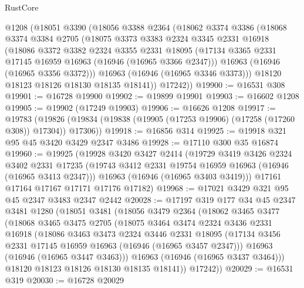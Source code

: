 \begin{lexlean}{RustCore}
\begin{coremodule}
    @1208
    (@18051
      @3390
      (@18056
        @3388
        @2364
        (@18062
          @3374
          @3386
          (@18068
            @3374
            @3384
            @2705
            (@18075
              @3373
              @3383
              @2324
              @3345
              @2331
              @16918
              (@18086
                @3372
                @3382
                @2324
                @3355
                @2331
                @18095
                (@17134 @3365 @2331 @17145 @16959 @16963 (@16946 (@16965 @3366 @2347)))
                @16963
                (@16946 (@16965 @3356 @3372)))
              @16963
              (@16946 (@16965 @3346 @3373)))
            @18120
            @18123
            @18126
            @18130
            @18135
            @18141))
        @17242))
@19900 := @16531 @308
@19901 := @16728 @19900
@19902 := @19899 @19901
@19903 := @16602 @1208
@19905 := @19902 (@17249 @19903)
@19906 := @16626 @1208
@19917 := @19783
    (@19826 (@19834 (@19838 (@19905 (@17253 @19906) (@17258 (@17260 @308)) @17304)) @17306))
@19918 := @16856 @314
@19925 := @19918 @321 @95 @45 @3420 @3429 @2347 @3486
@19928 := @17110 @300 @35 @16874
@19960 := @19925
    (@19928
      @3420
      @3427
      @2414
      (@19729
        @3419
        @3426
        @2324
        @3402
        @2331
        @17235
        (@19743 @3412 @2331 @19754 @16959 @16963 (@16946 (@16965 @3413 @2347)))
        @16963
        (@16946 (@16965 @3403 @3419)))
      @17161
      @17164
      @17167
      @17171
      @17176
      @17182)
@19968 := @17021 @3429 @321 @95 @45 @2347 @3483 @2347 @2442
@20028 := @17197
    @319
    @177
    @34
    @45
    @2347
    @3481
    @1280
    (@18051
      @3481
      (@18056
        @3479
        @2364
        (@18062
          @3465
          @3477
          (@18068
            @3465
            @3475
            @2705
            (@18075
              @3464
              @3474
              @2324
              @3436
              @2331
              @16918
              (@18086
                @3463
                @3473
                @2324
                @3446
                @2331
                @18095
                (@17134 @3456 @2331 @17145 @16959 @16963 (@16946 (@16965 @3457 @2347)))
                @16963
                (@16946 (@16965 @3447 @3463)))
              @16963
              (@16946 (@16965 @3437 @3464)))
            @18120
            @18123
            @18126
            @18130
            @18135
            @18141))
        @17242))
@20029 := @16531 @319
@20030 := @16728 @20029

\end{coremodule}
\end{lexlean}
